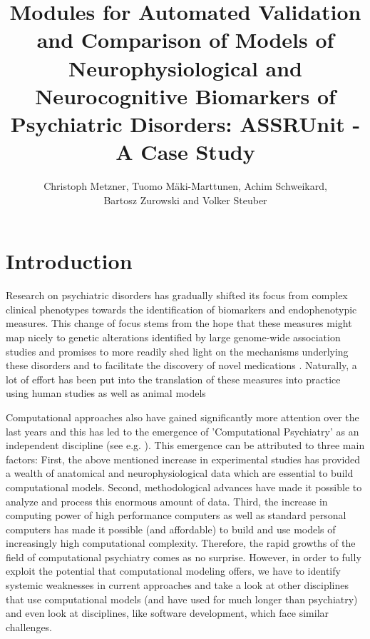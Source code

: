 \documentclass[a4paper,10pt]{article}
\title{Modules for Automated Validation and Comparison of Models of Neurophysiological and Neurocognitive Biomarkers of Psychiatric Disorders:
ASSRUnit - A Case Study}
\author{Christoph Metzner, Tuomo M\"aki-Marttunen, Achim Schweikard, \\ Bartosz Zurowski and Volker Steuber}
\begin{document}
\lstset{language=Python}

\maketitle

\begin{abstract}

\end{abstract}

\section{Introduction}



Research on psychiatric disorders has gradually shifted its focus from
complex clinical phenotypes towards the identification of biomarkers and 
endophenotypic measures. This change of focus stems from the hope
that these measures might map nicely to genetic 
alterations identified by large genome-wide association studies \cite{Meyer2006} and promises to more readily shed light on the mechanisms underlying
these disorders and to facilitate the discovery of novel medications \cite{Siekmeier2015}.
Naturally, a lot of effort has been put into the translation of these measures into practice using human studies \cite{Perlis2011}
as well as animal models \cite{Markou2009}

Computational approaches also have gained significantly more attention over the last years and this has led to the emergence of 
'Computational Psychiatry'
as an independent discipline (see e.g. \cite{Montague2012,Wang2014,Friston2014,Corlett2014,Stephan2014,Adams2016}).
This emergence can be attributed to three main factors: First, the above mentioned increase in experimental studies has provided 
a wealth of anatomical and neurophysiological data which are essential to build  computational models. Second, methodological advances
have made it possible to analyze and process this enormous amount of data. Third, the increase in computing power of high performance
computers as well as standard personal computers has made it possible (and affordable) to build and use models of increasingly high computational 
complexity. Therefore, the rapid growths of the field of computational psychiatry comes as no surprise.
However, in order to fully exploit the potential that computational modeling offers, we have to identify systemic weaknesses
in current approaches and take a look at other disciplines that use computational models (and have used for much longer than psychiatry)
and even look at disciplines, like software development, which face similar challenges.
\end{document}
